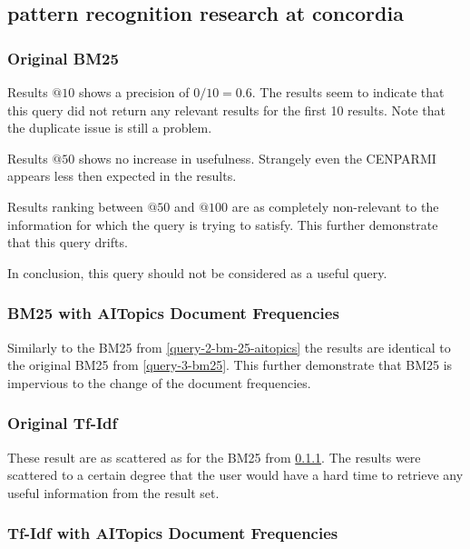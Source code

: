 \subsection{pattern recognition research at concordia}\label{query-9}

\subsubsection{Original BM25}\label{query-9-bm25}

\par Results $@10$ shows a precision of $0/10=0.6$. The results seem to indicate that this query did not return any relevant results for the first 10 results. Note that the duplicate issue is still a problem.
\par Results $@50$ shows no increase in usefulness. Strangely even the CENPARMI appears less then expected in the results.
\par Results ranking between $@50$ and $@100$ are as completely non-relevant to the information for which the query is trying to satisfy. This further demonstrate that this query drifts.
\par In conclusion, this query should not be considered as a useful query.

\subsubsection{BM25 with AITopics Document Frequencies}\label{query-9-bm25-aitopics}

\par Similarly to the BM25 from \ref{query-2-bm-25-aitopics} the results are identical to the original BM25 from \ref{query-3-bm25}. This further demonstrate that BM25 is impervious to the change of the document frequencies.

\subsubsection{Original Tf-Idf}\label{query-9-tf-idf}

\par These result are as scattered as for the BM25 from \ref{query-9-bm25}. The results were scattered to a certain degree that the user would have a hard time to retrieve any useful information from the result set.

\subsubsection{Tf-Idf with AITopics Document Frequencies} \label{query-9-tf-idf-aitopics}

